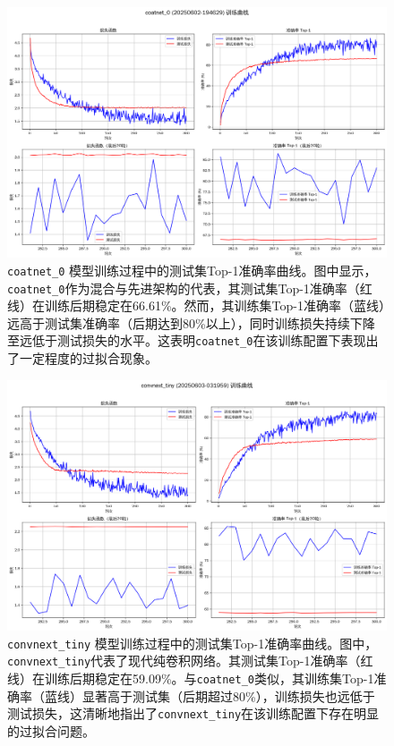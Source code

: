 \documentclass[a4paper]{article}
\begin{document}
\begin{description}
\begin{figure}[H]
    \centering
    \includegraphics[width=\textwidth]{training_curves_coatnet_0.png}
    \caption{\texttt{coatnet\_0} 模型训练过程中的测试集Top-1准确率曲线。图中显示，\texttt{coatnet\_0}作为混合与先进架构的代表，其测试集Top-1准确率（红线）在训练后期稳定在66.61\%。然而，其训练集Top-1准确率（蓝线）远高于测试集准确率（后期达到80\%以上），同时训练损失持续下降至远低于测试损失的水平。这表明\texttt{coatnet\_0}在该训练配置下表现出了一定程度的过拟合现象。}
    \label{fig:train_curve_coatnet0}
\end{figure}

\begin{figure}[H]
    \centering
    \includegraphics[width=\textwidth]{training_curves_convnext_tiny.png}
    \caption{\texttt{convnext\_tiny} 模型训练过程中的测试集Top-1准确率曲线。图中，\texttt{convnext\_tiny}代表了现代纯卷积网络。其测试集Top-1准确率（红线）在训练后期稳定在59.09\%。与\texttt{coatnet\_0}类似，其训练集Top-1准确率（蓝线）显著高于测试集（后期超过80\%），训练损失也远低于测试损失，这清晰地指出了\texttt{convnext\_tiny}在该训练配置下存在明显的过拟合问题。}
    \label{fig:train_curve_convnexttiny}
\end{figure}


\end{description}
\end{document}
